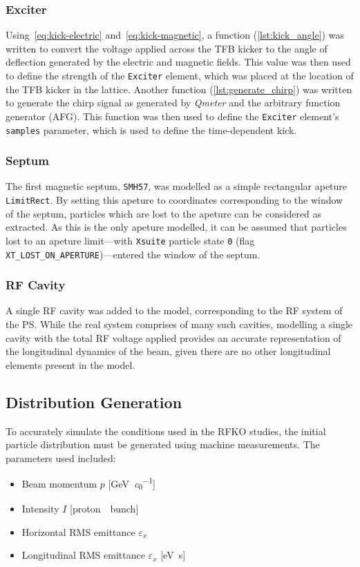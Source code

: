 \documentclass[11pt]{report}
\begin{document}
\subsubsection{Exciter}
Using~\autoref{eq:kick-electric} and~\autoref{eq:kick-magnetic}, a function (\autoref{lst:kick_angle}) was written to convert the voltage applied across the TFB kicker to the angle of deflection generated by the electric and magnetic fields. This value was then used to define the strength of the \verb|Exciter| element, which was placed at the location of the TFB kicker in the lattice. Another function (\autoref{lst:generate_chirp}) was written to generate the chirp signal as generated by \textit{Qmeter} and the arbitrary function generator (AFG). This function was then used to define the \verb|Exciter| element's \verb|samples| parameter, which is used to define the time-dependent kick. 

\subsubsection{Septum}
The first magnetic septum, \verb|SMH57|, was modelled as a simple rectangular apeture \verb|LimitRect|. By setting this apeture to coordinates corresponding to the window of the septum, particles which are lost to the apeture can be considered as extracted. As this is the only apeture modelled, it can be assumed that particles lost to an apeture limit---with \verb|Xsuite| particle state \verb|0| (flag \verb|XT_LOST_ON_APERTURE|)---entered the window of the septum. 

\subsubsection{RF Cavity}

A single RF cavity was added to the model, corresponding to the RF system of the PS. While the real system comprises of many such cavities, modelling a single cavity with the total RF voltage applied provides an accurate representation of the longitudinal dynamics of the beam, given there are no other longitudinal elements present in the model.

\subsection{Distribution Generation}

To accurately simulate the conditions used in the RFKO studies, the initial particle distribution must be generated using machine measurements. The parameters used included:
\begin{itemize}
  \item Beam momentum $p$ [\si{\giga\electronvolt\per\clight}]
  \item Intensity $I$ [\si{proton \per bunch}]
  \item Horizontal RMS emittance $\varepsilon_x$
  \item Longitudinal RMS emittance $\varepsilon_x$ [\si{\electronvolt\second}]
\end{itemize}  
\end{document}
